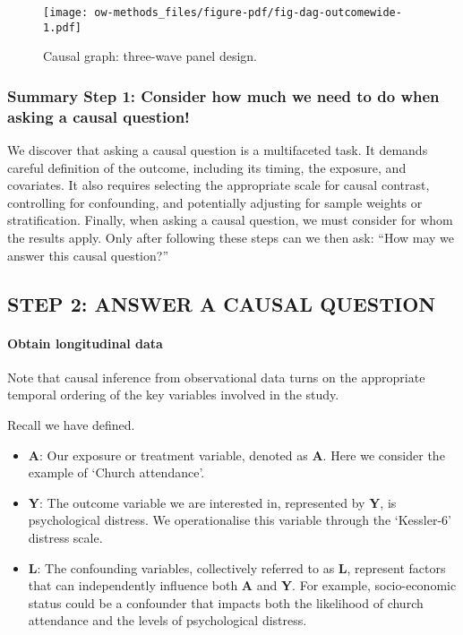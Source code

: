\documentclass[
  singlecolumn]{article}
\let\oldparagraph\paragraph
\renewcommand{\paragraph}[1]{\oldparagraph{#1}\mbox{}}
\begin{document}
\begin{figure}

{\centering \texttt{[image: ow-methods\_files/figure-pdf/fig-dag-outcomewide-1.pdf]}

}

\caption{\label{fig-dag-outcomewide}Causal graph: three-wave panel
design.}

\end{figure}

\subsubsection{Summary Step 1: Consider how much we need to do when
asking a causal
question!}\label{summary-step-1-consider-how-much-we-need-to-do-when-asking-a-causal-question}

We discover that asking a causal question is a multifaceted task. It
demands careful definition of the outcome, including its timing, the
exposure, and covariates. It also requires selecting the appropriate
scale for causal contrast, controlling for confounding, and potentially
adjusting for sample weights or stratification. Finally, when asking a
causal question, we must consider for whom the results apply. Only after
following these steps can we then ask: ``How may we answer this causal
question?''

\subsection{STEP 2: ANSWER A CAUSAL
QUESTION}\label{step-2-answer-a-causal-question}

\paragraph{Obtain longitudinal data}\label{obtain-longitudinal-data}

Note that causal inference from observational data turns on the
appropriate temporal ordering of the key variables involved in the
study.

Recall we have defined.

\begin{itemize}
\item
  \textbf{A}: Our exposure or treatment variable, denoted as \textbf{A}.
  Here we consider the example of `Church attendance'.
\item
  \textbf{Y}: The outcome variable we are interested in, represented by
  \textbf{Y}, is psychological distress. We operationalise this variable
  through the `Kessler-6' distress scale.
\item
  \textbf{L}: The confounding variables, collectively referred to as
  \textbf{L}, represent factors that can independently influence both
  \textbf{A} and \textbf{Y}. For example, socio-economic status could be
  a confounder that impacts both the likelihood of church attendance and
  the levels of psychological distress.
\end{itemize}
\end{document}
